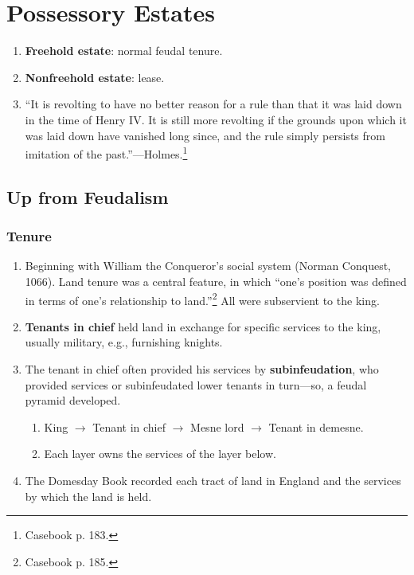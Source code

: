 \section{Possessory Estates}

\begin{enumerate}
    \item \textbf{Freehold estate}: normal feudal tenure.
    \item \textbf{Nonfreehold estate}: lease.
    \item ``It is revolting to have no better reason for a rule than that it 
    was laid down in the time of Henry IV. It is still more revolting if the 
    grounds upon which it was laid down have vanished long since, and the rule 
    simply persists from imitation of the past.''---Holmes.\footnote{Casebook 
    p. 183.}
\end{enumerate}

\subsection{Up from Feudalism}

\subsubsection{Tenure}

\begin{enumerate}
    \item Beginning with William the Conqueror's social system (Norman 
    Conquest, 1066). Land tenure was a central feature, in which ``one's 
    position was defined in terms of one's relationship to 
    land.''\footnote{Casebook p. 185.} All were subservient to the king.
    \item \textbf{Tenants in chief} held land in exchange for specific 
    services to the king, usually military, e.g., furnishing knights.
    \item The tenant in chief often provided his services by 
    \textbf{subinfeudation}, who provided services or subinfeudated lower 
    tenants in turn---so, a feudal pyramid developed.
    \begin{enumerate}
        \item King $\rightarrow$ Tenant in chief $\rightarrow$ Mesne lord 
        $\rightarrow$ Tenant in demesne.
        \item Each layer owns the services of the layer below.
    \end{enumerate}
    \item The Domesday Book recorded each tract of land in England and the 
    services by which the land is held.
\end{enumerate}

